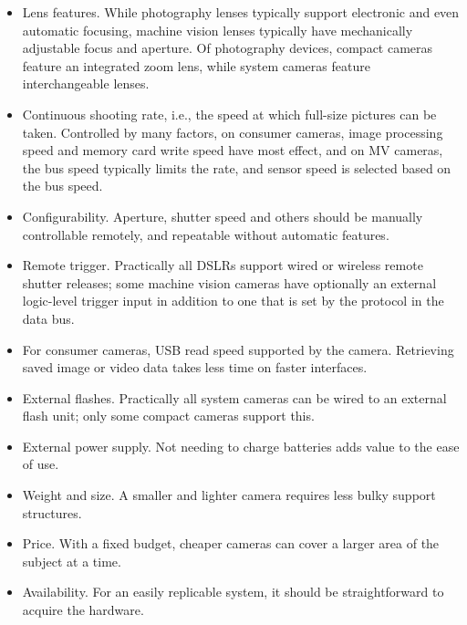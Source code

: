 \begin{itemize}
	\item Lens features.
		While photography lenses typically support electronic and even automatic focusing, machine vision lenses typically have mechanically adjustable focus and aperture.
		Of photography devices, compact cameras feature an integrated zoom lens, while system cameras feature interchangeable lenses.

	\item Continuous shooting rate, i.e., the speed at which full-size pictures can be taken.
		Controlled by many factors, on consumer cameras, image processing speed and memory card write speed have most effect, and on MV cameras, the bus speed typically limits the rate, and sensor speed is selected based on the bus speed.

	\item Configurability.
		Aperture, shutter speed and others should be manually controllable remotely, and repeatable without automatic features.

	\item Remote trigger.
		Practically all DSLRs support wired or wireless remote shutter releases; some machine vision cameras have optionally an external logic-level trigger input in addition to one that is set by the protocol in the data bus.

	\item For consumer cameras, USB read speed supported by the camera.
		Retrieving saved image or video data takes less time on faster interfaces.

	\item External flashes.
		Practically all system cameras can be wired to an external flash unit; only some compact cameras support this.

	\item External power supply.
		Not needing to charge batteries adds value to the ease of use.

	\item Weight and size.
		A smaller and lighter camera requires less bulky support structures.

	\item Price.
		With a fixed budget, cheaper cameras can cover a larger area of the subject at a time.

	\item Availability.
		For an easily replicable system, it should be straightforward to acquire the hardware.
\end{itemize}

